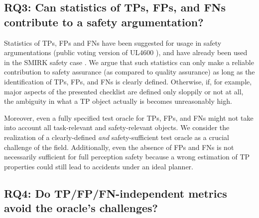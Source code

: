 \documentclass[conference]{IEEEtran}
\begin{document}
\subsection{RQ3: Can statistics of TPs, FPs, and FNs contribute to a safety argumentation?}
\label{sec:discussion_rq3}

Statistics of TPs, FPs and FNs have been suggested for usage in safety argumentations (public voting version of UL4600 \cite[Sec. 8.4.1.2]{UL4600_voting_2019}), and have already been used in the SMIRK safety case \cite[Sec. 6.3.1]{Borg2022smirk}.
We argue that such statistics can only make a reliable contribution to safety assurance (as compared to quality assurance) as long as the identification of TPs, FPs, and FNs is clearly defined. 
Otherwise, if, for example, major aspects of the presented checklist are defined only sloppily or not at all, the ambiguity in what a TP object actually is becomes unreasonably high. 

Moreover, even a fully specified test oracle for TPs, FPs, and FNs might not take into account all task-relevant and safety-relevant objects. 
We consider the realization of a clearly-defined \textit{and} safety-sufficient test oracle as a crucial challenge of the field.
Additionally, even the absence of FPs and FNs is not necessarily sufficient for full perception safety because a wrong estimation of TP properties could still lead to accidents under an ideal planner.

\subsection{RQ4: Do TP/FP/FN-independent metrics avoid the \newline oracle's challenges?}
\label{sec:discussion_rq4}
\end{document}
